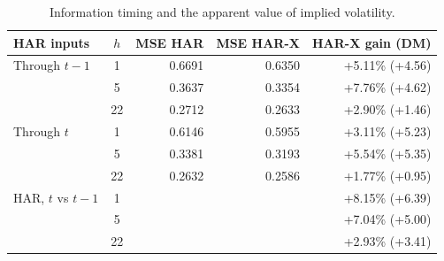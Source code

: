 \begin{table}[H]
\caption{Information timing and the apparent value of implied volatility.}
\label{tab:timing}
\small
\begin{tabularx}{\textwidth}{Xcrrr}
\toprule
HAR inputs & $h$ & MSE HAR & MSE HAR-X & HAR-X gain (DM) \\
\midrule
Through $t-1$ & 1 & 0.6691 & 0.6350 & +5.11\% (+4.56) \\
 & 5 & 0.3637 & 0.3354 & +7.76\% (+4.62) \\
 & 22 & 0.2712 & 0.2633 & +2.90\% (+1.46) \\
\midrule
Through $t$ & 1 & 0.6146 & 0.5955 & +3.11\% (+5.23) \\
 & 5 & 0.3381 & 0.3193 & +5.54\% (+5.35) \\
 & 22 & 0.2632 & 0.2586 & +1.77\% (+0.95) \\
\midrule
HAR, $t$ vs $t-1$ & 1 & & & +8.15\% (+6.39) \\
 & 5 & & & +7.04\% (+5.00) \\
 & 22 & & & +2.93\% (+3.41) \\
\bottomrule
\end{tabularx}
\end{table}
